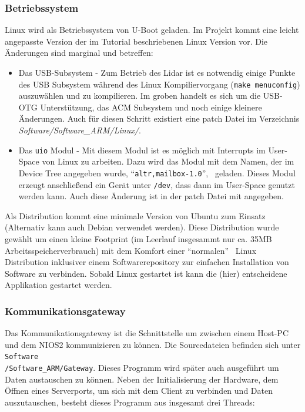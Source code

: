 \subsubsection{Betriebssystem}
Linux wird als Betriebssystem von U-Boot geladen. Im Projekt kommt eine leicht angepasste Version der im Tutorial beschriebenen Linux Version vor. Die Änderungen sind marginal und betreffen:
\begin{itemize}
	\item Das USB-Subsystem - Zum Betrieb des \ac{Lidar} ist es notwendig einige Punkte des USB Subsystem während des Linux Kompiliervorgang (\lstinline|make menuconfig|) auszuwählen und zu kompilieren. Im groben handelt es sich um die USB-OTG Unterstützung, das ACM Subsystem und noch einige kleinere Änderungen. Auch für diesen Schritt existiert eine patch Datei im Verzeichnis \textit{Software/Software\_ARM/Linux/}.
	\item Das \texttt{uio} Modul - Mit diesem Modul ist es möglich mit Interrupts im User-Space von Linux zu arbeiten. Dazu wird das Modul mit dem Namen, der im Device Tree angegeben wurde, \textquotedblleft \lstinline|altr,mailbox-1.0|\textquotedblright ,~ geladen. Dieses Modul erzeugt anschließend ein Gerät unter \texttt{/dev}, dass dann im User-Space genutzt werden kann. Auch diese Änderung ist in der patch Datei mit angegeben.
\end{itemize}
Als Distribution kommt eine minimale Version von Ubuntu zum Einsatz (Alternativ kann auch Debian verwendet werden). Diese Distribution wurde gewählt um einen kleine Footprint (im Leerlauf insgesammt nur ca. 35MB Arbeitsspeicherverbrauch) mit dem Komfort einer \textquotedblleft normalen\textquotedblright ~ Linux Distribution inklusiver einem Softwarerepository zur einfachen Installation von Software zu verbinden. Sobald Linux gestartet ist kann die (hier) entscheidene Applikation gestartet werden.

\subsubsection{Kommunikationsgateway}
Das Kommunikationsgateway ist die Schnittstelle um zwischen einem Host-PC und dem NIOS2 kommunizieren zu können. Die Sourcedateien befinden sich unter \texttt{Software\\/Software\_ARM/Gateway}. Dieses Programm wird später auch ausgeführt um Daten austauschen zu können. Neben der Initialisierung der Hardware, dem Öffnen eines Serverports, um sich mit dem Client zu verbinden und Daten auszutauschen, besteht dieses Programm aus insgesamt drei Threads:

